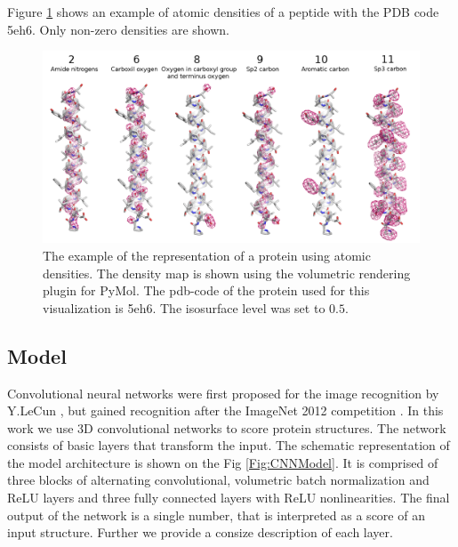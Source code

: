 \documentclass[a4paper,10pt]{article}
\begin{document}
Figure \ref{Fig:atomic_densities} shows an example of atomic densities of a peptide with the PDB code 5eh6.
Only non-zero densities are shown.

\begin{figure}[H]
    \centering
    \includegraphics[width=\linewidth]{Fig/atomic_densities_V3.png}
    \caption{The example of the representation of a protein using atomic densities. The density map is 
    shown using the volumetric rendering plugin for PyMol. The pdb-code of the protein used for this visualization is 5eh6.
    The isosurface level was set to $0.5$.}
    \label{Fig:atomic_densities}
\end{figure}

\subsection{Model}
Convolutional neural networks were first proposed for the image recognition by Y.LeCun \cite{lecun1989backpropagation}, 
but gained recognition after the 
ImageNet 2012 competition \cite{krizhevsky2012imagenet}. 
In this work we use 3D convolutional networks to score protein structures. The network consists of 
basic layers that transform the input.
The schematic representation of the model architecture is shown on the Fig \ref{Fig:CNNModel}.
It is comprised of three blocks of alternating convolutional, 
volumetric batch normalization and ReLU layers and three 
fully connected layers with ReLU nonlinearities. The final output of the network is a single number, 
that is interpreted as a score of an input structure. Further we provide a consize description of each layer.
\end{document}
